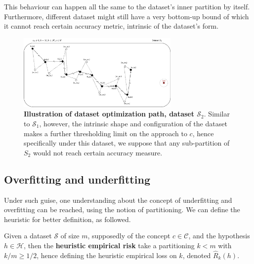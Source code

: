 \documentclass[twoside,10pt]{article}
\begin{document}
This behaviour can happen all the same to the dataset's inner partition by itself. Furthermore, different dataset might still have a very bottom-up bound of which it cannot reach certain accuracy metric, intrinsic of the dataset's form. 
\begin{figure}[htb]
  \centering
  \includegraphics[width=0.7\textwidth]{illustration_descent_algorithm2.png}
  \caption{\textbf{Illustration of dataset optimization path, dataset $\mathcal{S}_{2}$}. Similar to $\mathcal{S}_1$, however, the intrinsic shape and configuration of the dataset makes a further thresholding limit on the approach to $c$, hence specifically under this dataset, we suppose that any sub-partition of $S_{2}$ would not reach certain accuracy measure.}
\end{figure}
\subsection{Overfitting and underfitting}
Under such guise, one understanding about the concept of underfitting and overfitting \cite{gareth_james_introduction_2013} can be reached, using the notion of partitioning. We can define the heuristic for better definition, as followed. 

\begin{definition}
  Given a dataset $\mathcal{S}$ of size $m$, supposedly of the concept $c\in \mathcal{C}$, and the hypothesis $h\in \mathcal{H}$, then the \textbf{heuristic empirical risk} take a partitioning $k<m$ with $k/m\geq 1/2$, hence defining the heuristic empirical loss on $k$, denoted $\hat{R}_{k}(h)$. 
\end{definition}
\end{document}
